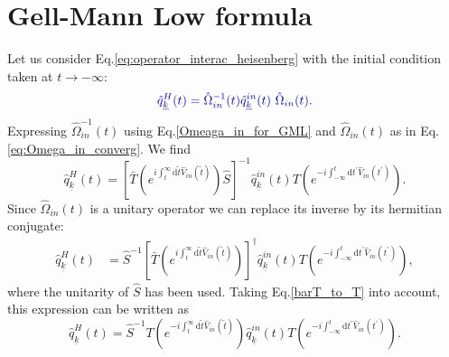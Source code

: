 \documentclass[
12pt, %
english, %
singlespacing, %
headsepline, %
]{MastersDoctoralThesis} %
\begin{document}
\section{Gell-Mann Low formula}
Let us consider Eq.\enskip\eqref{eq:operator_interac_heisenberg} with the initial condition taken at $ t \rightarrow - \infty $:
\begin{equation}\textcolor[RGB]{0,0,204}{
\hat{q}^{H}_{\underline{k}}(t)=\hat{\Omega}_{in}^{-1}(t)\hat{q}^{in}_{\underline{k}}(t)\ \hat{\Omega}_{in}(t).
}
\end{equation}
Expressing $ \hat{\Omega}^{-1}_{in}(t) $ using Eq.\enskip\eqref{Omeaga_in_for_GML} and $ \hat{\Omega}_{in}(t) $ as in Eq.\enskip\eqref{eq:Omega_in_converg}. We find 
\begin{equation}
\hat{q}^{H}_{\underline{k}}(t)
=\left[ 
\bar{T}
\left( 
 e^{i\int_{t}^{\infty}\mathrm{d}\tilde{t} \hat{V}_{in}(\tilde{t})}
\right) 
\hat{S}
\right]^{-1}
\hat{q}^{in}_{\underline{k}}(t)
T
\left( 
 e^{-i\int_{-\infty}^{t}\mathrm{d}t^{\prime} \hat{V}_{in}(t^{\prime})}
\right) 
.
\end{equation} 
Since $ \hat{\Omega}_{in}(t) $ is a unitary operator we can replace its inverse by its hermitian conjugate:
\begin{equation}
\begin{split}
\hat{q}^{H}_{\underline{k}}(t)
&=
\hat{S}^{-1}\left[ 
\bar{T}
\left( 
e^{i\int_{t}^{\infty}\mathrm{d}\tilde{t} \hat{V}_{in}(\tilde{t})}
\right) 
\right]^{\dagger}
\hat{q}^{in}_{\underline{k}}(t)
T
\left( 
 e^{-i\int_{-\infty}^{t}\mathrm{d}t^{\prime} \hat{V}_{in}(t^{\prime})}
\right) 
,
\end{split}
\end{equation}
where the unitarity of $ \hat{S} $ has been used.
Taking Eq.\enskip\eqref{barT_to_T} into account, this expression can be written as
\begin{equation}\label{1st_expression_for_Omega_H}
\hat{q}^{H}_{\underline{k}}(t)
=
\hat{S}^{-1} 
T
\left( 
 e^{-i\int_{t}^{\infty}\mathrm{d}\tilde{t} \hat{V}_{in}(\tilde{t})}
\right)
\hat{q}^{in}_{\underline{k}}(t)
T
\left( 
 e^{-i\int_{-\infty}^{t}\mathrm{d}t^{\prime} \hat{V}_{in}(t^{\prime})}
\right) .
\end{equation}
\end{document}
